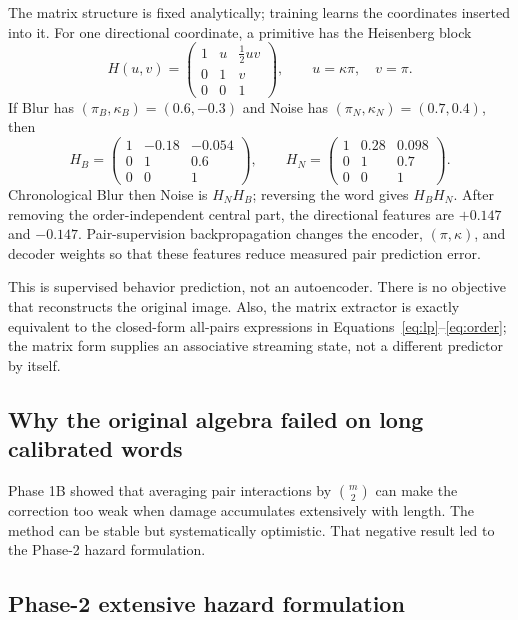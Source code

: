 \documentclass[11pt,a4paper]{article}
\begin{document}
The matrix structure is fixed analytically; training learns the coordinates
inserted into it.  For one directional coordinate, a primitive has the
Heisenberg block
\begin{equation}
H(u,v)=
\begin{pmatrix}
1 & u & \tfrac12uv\\
0 & 1 & v\\
0 & 0 & 1
\end{pmatrix},
\qquad u=\kappa\pi,\quad v=\pi.
\end{equation}
If Blur has $(\pi_B,\kappa_B)=(0.6,-0.3)$ and Noise has
$(\pi_N,\kappa_N)=(0.7,0.4)$, then
\[
H_B=
\begin{pmatrix}1&-0.18&-0.054\\0&1&0.6\\0&0&1\end{pmatrix},
\qquad
H_N=
\begin{pmatrix}1&0.28&0.098\\0&1&0.7\\0&0&1\end{pmatrix}.
\]
Chronological Blur then Noise is $H_NH_B$; reversing the word gives $H_BH_N$.
After removing the order-independent central part, the directional features are
$+0.147$ and $-0.147$.  Pair-supervision backpropagation changes the encoder,
$(\pi,\kappa)$, and decoder weights so that these features reduce measured pair
prediction error.

This is supervised behavior prediction, not an autoencoder.  There is no
objective that reconstructs the original image.  Also, the matrix extractor is
exactly equivalent to the closed-form all-pairs expressions in
Equations~\eqref{eq:lp}--\eqref{eq:order}; the matrix form supplies an
associative streaming state, not a different predictor by itself.

\subsection{Why the original algebra failed on long calibrated words}

Phase 1B showed that averaging pair interactions by $\binom{m}{2}$ can make the
correction too weak when damage accumulates extensively with length.  The
method can be stable but systematically optimistic.  That negative result led
to the Phase-2 hazard formulation.

\subsection{Phase-2 extensive hazard formulation}
\end{document}
